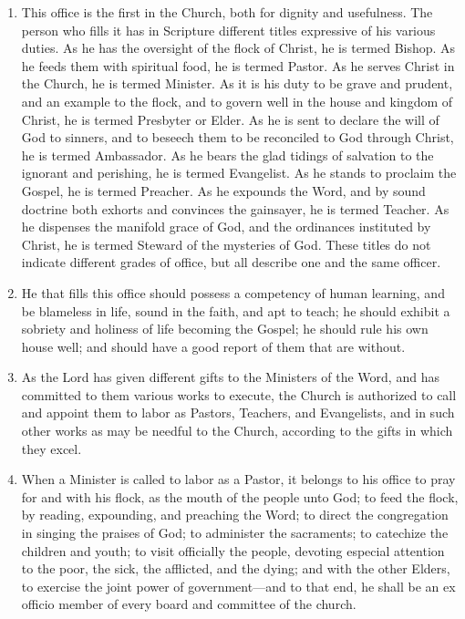 \documentclass[
]{book}
\providecommand{\tightlist}{%
  \setlength{\itemsep}{0pt}\setlength{\parskip}{0pt}}
\begin{document}
\begin{enumerate}
\def\labelenumi{\arabic{enumi}.}
\tightlist
\item
  \protect\hypertarget{9}{\href{}{}}This office is the first in the Church, both for dignity and usefulness. The person who fills it has in Scripture different titles expressive of his various duties. As he has the oversight of the flock of Christ, he is termed Bishop. As he feeds them with spiritual food, he is termed Pastor. As he serves Christ in the Church, he is termed Minister. As it is his duty to be grave and prudent, and an example to the flock, and to govern well in the house and kingdom of Christ, he is termed Presbyter or Elder. As he is sent to declare the will of God to sinners, and to beseech them to be reconciled to God through Christ, he is termed Ambassador. As he bears the glad tidings of salvation to the ignorant and perishing, he is termed Evangelist. As he stands to proclaim the Gospel, he is termed Preacher. As he expounds the Word, and by sound doctrine both exhorts and convinces the gainsayer, he is termed Teacher. As he dispenses the manifold grace of God, and the ordinances instituted by Christ, he is termed Steward of the mysteries of God. These titles do not indicate different grades of office, but all describe one and the same officer.
\item
  He that fills this office should possess a competency of human learning, and be blameless in life, sound in the faith, and apt to teach; he should exhibit a sobriety and holiness of life becoming the Gospel; he should rule his own house well; and should have a good report of them that are without.
\item
  As the Lord has given different gifts to the Ministers of the Word, and has committed to them various works to execute, the Church is authorized to call and appoint them to labor as Pastors, Teachers, and Evangelists, and in such other works as may be needful to the Church, according to the gifts in which they excel.
\item
  When a Minister is called to labor as a Pastor, it belongs to his office to pray for and with his flock, as the mouth of the people unto God; to feed the flock, by reading, expounding, and preaching the Word; to direct the congregation in singing the praises of God; to administer the sacraments; to catechize the children and youth; to visit officially the people, devoting especial attention to the poor, the sick, the afflicted, and the dying; and with the other Elders, to exercise the joint power of government---and to that end, he shall be an ex officio member of every board and committee of the church.

\end{enumerate}
\end{document}
